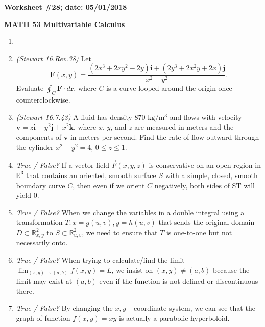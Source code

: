 \documentclass{article}
\newcommand{\ii}{\mathbf{i}}
\newcommand{\jj}{\mathbf{j}}
\newcommand{\kk}{\mathbf{k}}
\newcommand{\rr}{\mathbf{r}}
\newcommand{\vv}{\mathbf{v}}
\newcommand{\FF}{\mathbf{F}}
\begin{document}
{\bf Worksheet \#28; date: 05/01/2018}

{\bf MATH 53 Multivariable Calculus}

\begin{enumerate}
\item {\em }

\item {\em (Stewart 16.Rev.38)} Let
\[
\FF(x, y) = \frac{(2x^3 + 2xy^2 - 2y) \ii + (2y^3 + 2x^2 y + 2x) \jj}{x^2 + y^2}.
\]
Evaluate $\oint_C \FF \cdot d\rr$, where $C$ is a curve looped around the origin once counterclockwise.

\item {\em (Stewart 16.7.43)} A fluid has density $870 \text{ kg}/\text{m}^3$ and flows with velocity $\vv = z \ii + y^2 \jj + x^2 \kk$, where $x$, $y$, and $z$ are measured in meters and the components of $\vv$ in meters per second. Find the rate of flow outward through the cylinder $x^2 + y^2 = 4$, $0 \le z \le 1$.

\item {\em True / False?} If a vector field $\vec{F}(x,y,z)$ is conservative on an open region in $\mathbb{R}^3$ that contains an oriented, smooth surface $S$ with a simple, closed, smooth boundary curve $C$, then even if we orient $C$ negatively, both sides of ST will yield $0$.

\item {\em True / False?} When we change the variables in a double integral using a transformation $T: x=g(u,v), y=h(u,v)$ that sends the original domain $D\subset \mathbb{R}^2_{x,y}$ to $S\subset \mathbb{R}^2_{u,v}$, we need to ensure that $T$ is one-to-one but not necessarily onto.

\item {\em True / False?} When trying to calculate/find the limit $\displaystyle{\lim_{(x,y)\rightarrow(a,b)}f(x,y)=L}$, we insist on $(x,y){\not =} (a,b)$ because the limit may exist at $(a,b)$ even if the function is not defined or discontinuous there.

\item {\em True / False?} By changing the $x,y$−-coordinate system, we can see that the graph of function $f(x,y)=xy$ is actually a parabolic hyperboloid.
\end{enumerate}
\end{document}
